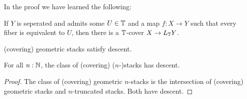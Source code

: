 In the proof we have learned the following:
\begin{lemma}{\label{lemma:stackificationHasTCover}}
	If $Y$ is seperated and admits some $U \in \mathbb{T}$ and a map $f : X \to Y$ such that every fiber is equivalent to $U$, then there is a $\mathbb{T}$-cover $X \to L_{\mathbb{T}} Y$.
\end{lemma}
\begin{corollary}
	(covering) geometric stacks satisfy descent.
\end{corollary}

\begin{corollary}
	For all $n : \mathbb{N} $, the class of (covering) ($n$-)stacks has descent.
\end{corollary}
\begin{proof}
	The class of (covering) geometric $n$-stacks is the intersection of (covering) geometric stacks and $n$-truncated stacks. Both have descent.
\end{proof}

